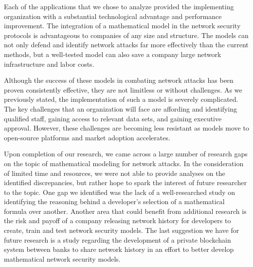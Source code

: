 \documentclass{article}
\begin{document}
Each of the applications that we chose to analyze provided the implementing organization with a substantial technological advantage and performance improvement. The integration of a mathematical model in the network security protocols is advantageous to companies of any size and structure. The models can not only defend and identify network attacks far more effectively than the current methods, but a well-tested model can also save a company large network infrastructure and labor costs. 

Although the success of these models in combating network attacks has been proven consistently effective, they are not limitless or without challenges. As we previously stated, the implementation of such a model is severely complicated. The key challenges that an organization will face are affording and identifying qualified staff, gaining access to relevant data sets, and gaining executive approval. However, these challenges are becoming less resistant as models move to open-source platforms and market adoption accelerates. 

Upon completion of our research, we came across a large number of research gaps on the topic of mathematical modeling for network attacks. In the consideration of limited time and resources, we were not able to provide analyses on the identified discrepancies, but rather hope to spark the interest of future researcher to the topic. One gap we identified was the lack of a well-researched study on identifying the reasoning behind a developer’s selection of a mathematical formula over another. Another area that could benefit from additional research is the risk and payoff of a company releasing network history for developers to create, train and test network security models. The last suggestion we have for future research is a study regarding the development of a private blockchain system between banks to share network history in an effort to better develop mathematical network security models. 

\printbibliography
\end{document}

